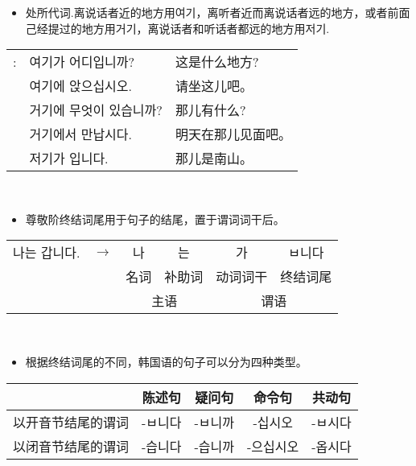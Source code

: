 \begin{grammar}
\begin{grammarsect}[\kr 여기, 거기, 저기]
        \begin{itemize}
            \item 处所代词.离说话者近的地方用{\kr 여기}，离听者近而离说话者远的地方，或者前面己经提过的地方用{\kr 거기}，离说话者和听话者都远的地方用{\kr 저기}.
        \end{itemize}
        \begin{tabular}{lll}
            \kr \ruby{例}{예}:&\kr  여기가 어디입니까?&这是什么地方? \\
            &\kr 여기에 앉으십시오.&请坐这儿吧。\\
            &\kr 거기에 무엇이 있습니까?&那儿有什么?\\
            &\kr \ruby{來日}{내일} 거기에서 만납시다.&明天在那儿见面吧。\\
            &\kr 저기가 \ruby{南山}{남산}입니다.&那儿是南山。
        \end{tabular}\\
    \end{grammarsect}
    \begin{grammarsect}[尊敬阶终结词尾]\label{gram:ref}
        \begin{itemize}
            \item 尊敬阶终结词尾用于句子的结尾，置于谓词词干后。
        \end{itemize}
        \begin{tabular}{llcccc}
            \kr 나는 갑니다.&$\to $&\kr 나&\kr 는&\kr 가&\kr ㅂ니다\\
            &&名词&补助词&动词词干&终结词尾\\\cmidrule(r){3-4} \cmidrule(l){5-6}
            &&\multicolumn{2}{c}{主语}&\multicolumn{2}{c}{谓语}
        \end{tabular}\\
        \begin{itemize}
            \item 根据终结词尾的不同，韩国语的句子可以分为四种类型。
        \end{itemize}
        \begin{tabular}{|c|c|c|c|c|}\hline
            \diagbox{谓词类型}{句子类型}&陈述句&疑问句&命令句&共动句\\\hline
            以开音节结尾的谓词 &\kr -ㅂ니다 &\kr -ㅂ니까 &\kr -십시오 &\kr -ㅂ시다\\\hline
            以闭音节结尾的谓词 &\kr -습니다 &\kr -습니까 &\kr -으십시오 &\kr -옵시다\\\hline
        \end{tabular}\\

\end{grammarsect}
\end{grammar}
